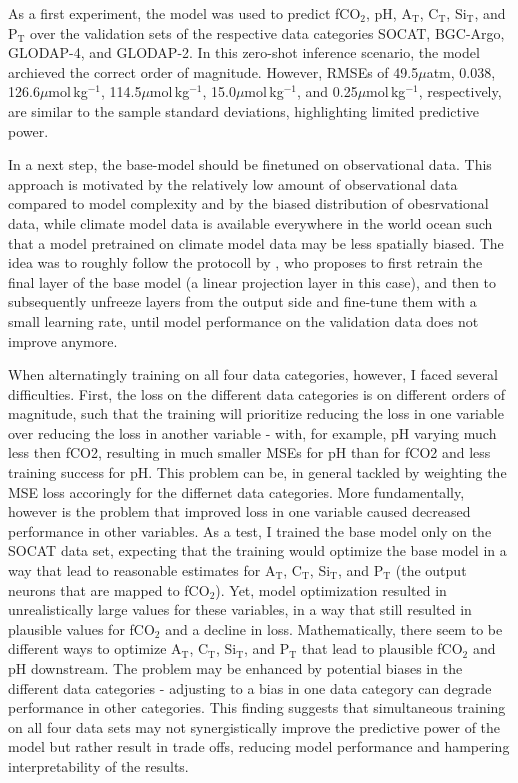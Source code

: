 \documentclass{article}
\begin{document}
	As a first experiment, the model was used to predict fCO$_2$, pH, A$_\text{T}$, C$_\text{T}$, Si$_\text{T}$, and P$_\text{T}$ over the validation sets of the respective data categories SOCAT, BGC-Argo, GLODAP-4, and GLODAP-2. In this zero-shot inference scenario, the model archieved the correct order of magnitude. However, RMSEs of 49.5$\mu$atm, 0.038, 126.6$\mu$mol\,kg$^{-1}$, 114.5$\mu$mol\,kg$^{-1}$,  15.0$\mu$mol\,kg$^{-1}$, and 0.25$\mu$mol\,kg$^{-1}$, respectively, are similar to the sample standard deviations, highlighting limited predictive power.   
	
	In a next step, the base-model should be finetuned on observational data. This approach is motivated by the relatively low amount of observational data compared to model complexity and by the biased distribution of obesrvational data, while climate model data is available everywhere in the world ocean such that a model pretrained on climate model data may be less spatially biased. The idea was to roughly follow the protocoll by \cite{geron2019hands}, who proposes to first retrain the final layer of the base model (a linear projection layer in this case), and then to subsequently unfreeze layers from the output side and fine-tune them with a small learning rate, until model performance on the validation data does not improve anymore. 
	
	When alternatingly training on all four data categories, however, I faced several difficulties. First, the loss on the different data categories is on different orders of magnitude, such that the training will prioritize reducing the loss in one variable over reducing the loss in another variable - with, for example, pH varying much less then fCO2, resulting in much smaller MSEs for pH than for fCO2 and less training success for pH. This problem can be, in general tackled by weighting the MSE loss accoringly for the differnet data categories. More fundamentally, however is the problem that improved loss in one variable caused decreased performance in other variables. As a test, I trained the base model only on the SOCAT data set, expecting that the training would optimize the base model in a way that lead to reasonable estimates for A$_\text{T}$, C$_\text{T}$, Si$_\text{T}$, and P$_\text{T}$ (the output neurons that are mapped to fCO$_2$). Yet, model optimization resulted in unrealistically large values for these variables, in a way that still resulted in plausible values for fCO$_2$ and a decline in loss. Mathematically, there seem to be different ways to optimize A$_\text{T}$, C$_\text{T}$, Si$_\text{T}$, and P$_\text{T}$ that lead to plausible fCO$_2$ and pH downstream. The problem may be enhanced by potential biases in the different data categories - adjusting to a bias in one data category can degrade performance in other categories. This finding suggests that simultaneous training on all four data sets may not synergistically improve the predictive power of the model but rather result in trade offs, reducing model performance and hampering interpretability of the results.   
	
\end{document}
